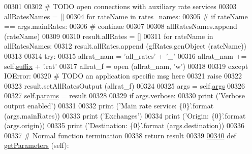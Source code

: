 \begin{DoxyCode}
{00301             
00302         \textcolor{comment}{# TODO open connections with auxiliary rate services}
00303         allRatesNames = []        
00304         \textcolor{keywordflow}{for} rateName \textcolor{keywordflow}{in} rates\_names:
00305 \textcolor{comment}{#            if rateName == args.mainRates:}
00306 \textcolor{comment}{#                continue }
00307             
00308             allRatesNames.append (rateName)
00309 
00310         result.allRates = []            
00311         \textcolor{keywordflow}{for} rateName \textcolor{keywordflow}{in} allRatesNames:
00312             result.allRates.append (gfRates.genObject (rateName))
00313             
00314         \textcolor{keywordflow}{try}:
00315             allrat\_nam  =  \textcolor{stringliteral}{'all\_rates'} + \textcolor{stringliteral}{'\_'}
00316             allrat\_nam +=  self.\hyperlink{classe2e_1_1_application_a4d824ad36b051d2d629edb314385df0d}{suffix} + \textcolor{stringliteral}{'.rat'}
00317             allrat\_f = open (allrat\_nam, \textcolor{stringliteral}{'w'})
00318             
00319         \textcolor{keywordflow}{except} IOError:
00320             \textcolor{comment}{# TODO an application specific msg here}
00321             \textcolor{keywordflow}{raise}        
00322 
00323         result.setAllRatesOutput (allrat\_f)
00324         
00325         args = self.\hyperlink{classe2e_1_1_application_abade6fc2e2c04ddd7e48137a2a7721bd}{args} 
00326         
00327         self.\hyperlink{classe2e_1_1_application_a57206c6ccc86c2659edfd8d73d2029f3}{params} = result
00328                
00329         \textcolor{keywordflow}{if} args.verbose:            
00330             \textcolor{keywordflow}{print} (\textcolor{stringliteral}{'Verbose output enabled'})
00331             
00332             \textcolor{keywordflow}{print} (\textcolor{stringliteral}{'Main rate service: \{0\}'}.format (args.mainRates))
00333             \textcolor{keywordflow}{print} (\textcolor{stringliteral}{'Exchanges'})
00334             \textcolor{keywordflow}{print} (\textcolor{stringliteral}{'Origin:            \{0\}'}.format (args.origin))
00335             \textcolor{keywordflow}{print} (\textcolor{stringliteral}{'Destination:       \{0\}'}.format (args.destination))
00336             
00337         \textcolor{comment}{# Normal function termination }
00338         \textcolor{keywordflow}{return} result 
00339         
\hypertarget{e2e_8py_source.tex_l00340}{}\hyperlink{classe2e_1_1_application_ae7bc7b58f19d681635cfa8ae06d9769b}{00340}     \textcolor{keyword}{def }\hyperlink{classe2e_1_1_application_ae7bc7b58f19d681635cfa8ae06d9769b}{getParameters} (self): 
}
\end{DoxyCode}
